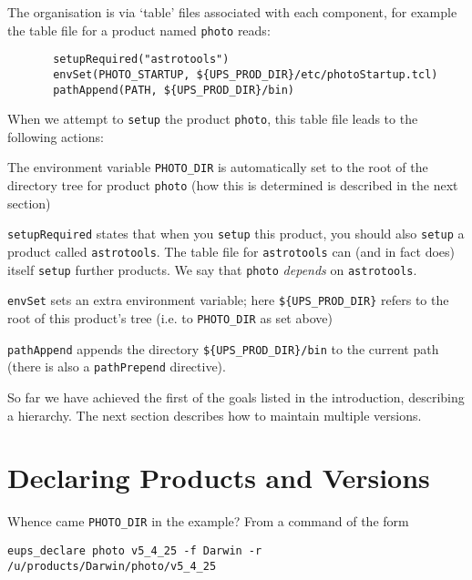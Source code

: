 \documentclass{article}
\newcommand{\code}[1]{\texttt{#1}}
\begin{document}
The organisation is via `table' files
associated with each component, for example the table file
for a product named \code{photo} reads:
\begin{verbatim}
       setupRequired("astrotools")
       envSet(PHOTO_STARTUP, ${UPS_PROD_DIR}/etc/photoStartup.tcl)
       pathAppend(PATH, ${UPS_PROD_DIR}/bin)
\end{verbatim}

When we attempt to \code{setup} the product \code{photo}, this
table file leads to the following actions:
\begin{description}
\item
  The environment variable \code{PHOTO\_DIR} is automatically set to 
  the root of the directory tree for product \code{photo} (how this
  is determined is described in the next section)
\item
  \code{setupRequired} states that when you \code{setup} this product, you
  should also \code{setup} a product called \code{astrotools}.
  The table file for \code{astrotools} can
  (and in fact does) itself \code{setup} further products.  We say that
  \code{photo} \emph{depends} on \code{astrotools}.
\item
  \code{envSet} sets an extra environment variable; here \code{\$\{UPS\_PROD\_DIR\}}
  refers to the root of this product's tree (i.e. to \code{PHOTO\_DIR} as set above)
\item
  \code{pathAppend} appends
  the directory \code{\$\{UPS\_PROD\_DIR\}/bin} to the current path (there
  is also a \code{pathPrepend} directive).
\end{description}

So far we have achieved the first of the goals listed in the introduction,
describing a hierarchy.  The next section describes how to maintain
multiple versions.

\section{Declaring Products and Versions}

Whence came \code{PHOTO\_DIR} in the example? From a command of the form
\begin{verbatim}
eups_declare photo v5_4_25 -f Darwin -r /u/products/Darwin/photo/v5_4_25
\end{verbatim}
\end{document}
